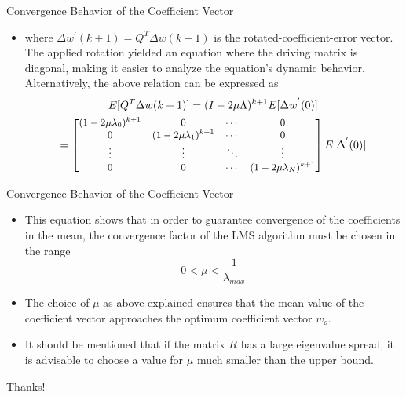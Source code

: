 \documentclass{beamer}
\begin{document}
\begin{frame}{Convergence Behavior of the Coefficient Vector}
    \begin{itemize}
       \item where $\Delta w^{'}(k + 1)= Q^T \Delta w(k + 1)$ is the rotated-coefficient-error vector. The applied rotation yielded an equation where the driving matrix is diagonal, making it easier to analyze the equation’s dynamic behavior. Alternatively, the above relation can be expressed as
       \begin{multline}
        E[Q^T\Delta w(k+1)] = (I - 2\mu \Lambda)^{k+1}E[\Delta w^{'}(0)]\\
                           ={\small\begin{bmatrix}
                            (1-2\mu \lambda_0)^{k+1} & 0 & \cdots & 0 \\
                            0 & (1-2\mu \lambda_1)^{k+1} & \cdots & 0 \\
                            \vdots & \vdots & \ddots & \vdots \\
                            0 & 0 & \cdots &(1-2\mu \lambda_N)^{k+1}
                           \end{bmatrix}E[\Delta^{'}(0)]}                  
        \end{multline} 
        
    \end{itemize}
\end{frame}

\begin{frame}{Convergence Behavior of the Coefficient Vector}
    \begin{itemize}
     \item This equation shows that in order to guarantee convergence of the coefficients in the mean, the convergence factor of the LMS algorithm must be chosen in the range 
     \begin{equation}
        0 < \mu < \frac{1}{\lambda_{max}}
     \end{equation}   
    \item The choice of $\mu$ as above explained ensures that the mean value of the coefficient vector approaches the optimum coefficient
    vector $w_o$. 
    \item It should be mentioned that if the matrix $R$ has a large eigenvalue spread, it is advisable to choose a value for $\mu$
    much smaller than the upper bound. 
    \end{itemize}
\end{frame}



\begin{frame}
    \begin{center}
        {\Huge\calligra Thanks!}
    \end{center}
\end{frame}
\end{document}
